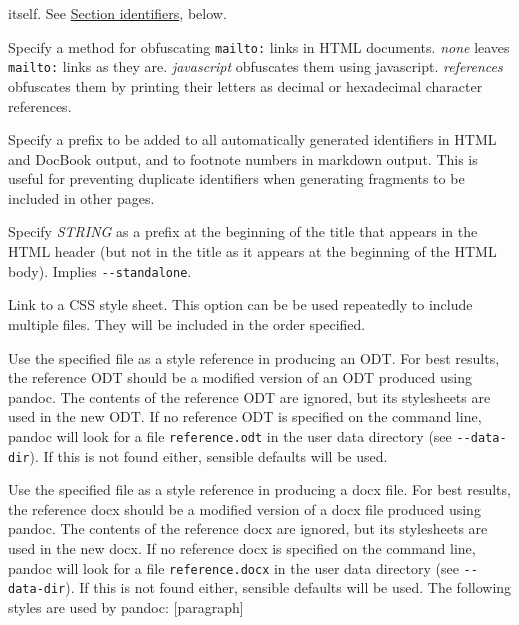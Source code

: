 \documentclass[]{article}
\begin{document}
\begin{description}
itself. See
\hyperref[header-identifiers-in-html-latex-and-context]{Section
identifiers}, below.
\item[\texttt{-{}-email-obfuscation=}\emph{none\textbar{}javascript\textbar{}references}]
Specify a method for obfuscating \texttt{mailto:} links in HTML
documents. \emph{none} leaves \texttt{mailto:} links as they are.
\emph{javascript} obfuscates them using javascript. \emph{references}
obfuscates them by printing their letters as decimal or hexadecimal
character references.
\item[\texttt{-{}-id-prefix}=\emph{STRING}]
Specify a prefix to be added to all automatically generated identifiers
in HTML and DocBook output, and to footnote numbers in markdown output.
This is useful for preventing duplicate identifiers when generating
fragments to be included in other pages.
\item[\texttt{-T} \emph{STRING},
\texttt{-{}-title-prefix=}\emph{STRING}]
Specify \emph{STRING} as a prefix at the beginning of the title that
appears in the HTML header (but not in the title as it appears at the
beginning of the HTML body). Implies \texttt{-{}-standalone}.
\item[\texttt{-c} \emph{URL}, \texttt{-{}-css=}\emph{URL}]
Link to a CSS style sheet. This option can be be used repeatedly to
include multiple files. They will be included in the order specified.
\item[\texttt{-{}-reference-odt=}\emph{FILE}]
Use the specified file as a style reference in producing an ODT. For
best results, the reference ODT should be a modified version of an ODT
produced using pandoc. The contents of the reference ODT are ignored,
but its stylesheets are used in the new ODT. If no reference ODT is
specified on the command line, pandoc will look for a file
\texttt{reference.odt} in the user data directory (see
\texttt{-{}-data-dir}). If this is not found either, sensible defaults
will be used.
\item[\texttt{-{}-reference-docx=}\emph{FILE}]
Use the specified file as a style reference in producing a docx file.
For best results, the reference docx should be a modified version of a
docx file produced using pandoc. The contents of the reference docx are
ignored, but its stylesheets are used in the new docx. If no reference
docx is specified on the command line, pandoc will look for a file
\texttt{reference.docx} in the user data directory (see
\texttt{-{}-data-dir}). If this is not found either, sensible defaults
will be used. The following styles are used by pandoc: {[}paragraph{]}

\end{description}
\end{document}
